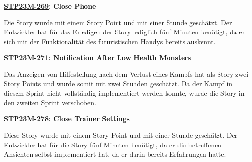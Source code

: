 \textbf{\hyperlink{T269}{\hypertarget{S269}{STP23M-269}}: Close Phone}

Die Story wurde mit einem Story Point und mit einer Stunde geschätzt. Der Entwickler hat für das Erledigen der Story lediglich fünf Minuten benötigt, da er sich mit der Funktionalität des futuristischen Handys bereits auskennt.

\textbf{\hyperlink{T271}{\hypertarget{S271}{STP23M-271}}: Notification After Low Health Monsters}

Das Anzeigen von Hilfestellung nach dem Verlust eines Kampfs hat als Story zwei Story Points und wurde somit mit zwei Stunden geschätzt. Da der Kampf in diesem Sprint nicht vollständig implementiert werden konnte, wurde die Story in den zweiten Sprint verschoben.

\textbf{\hyperlink{T278}{\hypertarget{S278}{STP23M-278}}: Close Trainer Settings}

Diese Story wurde mit einem Story Point und mit einer Stunde geschätzt. Der Entwickler hat für die Story fünf Minuten benötigt, da er die betroffenen Ansichten selbst implementiert hat, da er darin bereits Erfahrungen hatte.